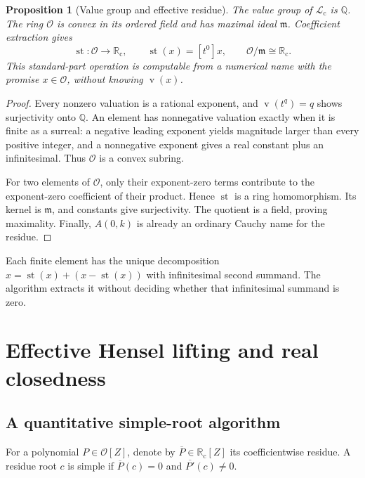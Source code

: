 \documentclass[11pt,letterpaper]{article}
\numberwithin{equation}{section}
\newtheorem{proposition}[theorem]{Proposition}
\theoremstyle{definition}
\theoremstyle{remark}
\newcommand{\Rc}{\mathbb R_{\mathrm c}}
\newcommand{\Lc}{\mathcal L_{\mathrm c}}
\newcommand{\Q}{\mathbb Q}
\newcommand{\st}{\operatorname{st}}
\newcommand{\val}{\operatorname{v}}
\newcommand{\coef}[2]{[t^{#1}]#2}
\newcommand{\Oh}{\mathcal O}
\newcommand{\mh}{\mathfrak m}
\begin{document}
\begin{proposition}[Value group and effective residue]
\label{prop:residue}
The value group of $\Lc$ is $\Q$. The ring $\Oh$ is convex in its ordered
field and has maximal ideal $\mh$. Coefficient extraction gives
\[
 \st:\Oh\longrightarrow\Rc,\qquad \st(x)=\coef0x,
 \qquad \Oh/\mh\cong\Rc.
\]
This standard-part operation is computable from a numerical name with the
promise $x\in\Oh$, without knowing $\val(x)$.
\end{proposition}
\begin{proof}
Every nonzero valuation is a rational exponent, and $\val(t^q)=q$ shows
surjectivity onto $\Q$. An element has nonnegative valuation exactly when
it is finite as a surreal: a negative leading exponent yields magnitude
larger than every positive integer, and a nonnegative exponent gives a real
constant plus an infinitesimal. Thus $\Oh$ is a convex subring.

For two elements of $\Oh$, only their exponent-zero terms contribute to
the exponent-zero coefficient of their product. Hence $\st$ is a ring
homomorphism. Its kernel is $\mh$, and constants give surjectivity. The
quotient is a field, proving maximality. Finally, $A(0,k)$ is already an
ordinary Cauchy name for the residue.
\end{proof}

Each finite element has the unique decomposition
$x=\st(x)+(x-\st(x))$ with infinitesimal second summand. The algorithm
extracts it without deciding whether that infinitesimal summand is zero.

\section{Effective Hensel lifting and real closedness}
\label{sec:realclosed}

\subsection{A quantitative simple-root algorithm}

For a polynomial $P\in\Oh[Z]$, denote by $\overline P\in\Rc[Z]$ its
coefficientwise residue. A residue root $c$ is simple if
$\overline P(c)=0$ and $\overline{P'}(c)\ne0$.
\end{document}
